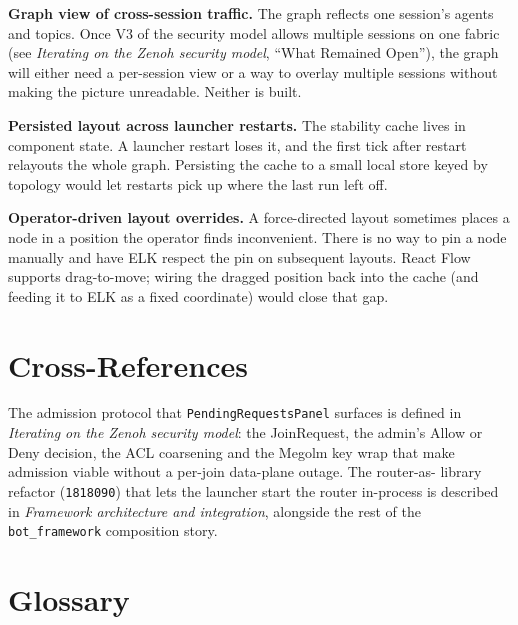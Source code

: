 \documentclass[11pt,a4paper]{article}
\begin{document}
\textbf{Graph view of cross-session traffic.} The graph reflects
one session's agents and topics. Once V3 of the security model
allows multiple sessions on one fabric (see
\emph{Iterating on the Zenoh security model}, ``What Remained
Open''), the graph will either need a per-session view or a way
to overlay multiple sessions without making the picture
unreadable. Neither is built.

\textbf{Persisted layout across launcher restarts.} The
stability cache lives in component state. A launcher restart
loses it, and the first tick after restart relayouts the whole
graph. Persisting the cache to a small local store keyed by
topology would let restarts pick up where the last run left off.

\textbf{Operator-driven layout overrides.} A force-directed
layout sometimes places a node in a position the operator finds
inconvenient. There is no way to pin a node manually and have
ELK respect the pin on subsequent layouts. React Flow supports
drag-to-move; wiring the dragged position back into the cache
(and feeding it to ELK as a fixed coordinate) would close that
gap.

\section{Cross-References}

The admission protocol that \texttt{PendingRequestsPanel}
surfaces is defined in \emph{Iterating on the Zenoh security
model}: the JoinRequest, the admin's Allow or Deny decision, the
ACL coarsening and the Megolm key wrap that make admission
viable without a per-join data-plane outage. The router-as-
library refactor (\texttt{1818090}) that lets the launcher start
the router in-process is described in \emph{Framework
architecture and integration}, alongside the rest of the
\texttt{bot\_framework} composition story.

\section*{Glossary}
\end{document}
